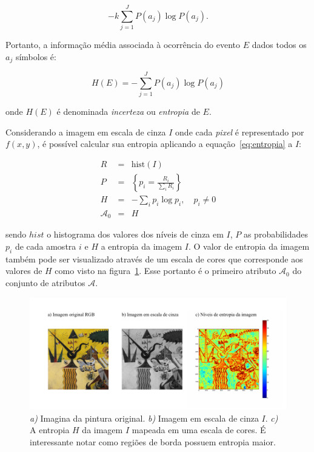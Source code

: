 \begin{equation}
  -k \sum_{j=1}^J P(a_j) \log P(a_j).
\end{equation}

Portanto, a informação média associada à ocorrência do evento $E$
dados todos os $a_j$ símbolos é:

\begin{equation}
  H(E) =  -\sum_{j=1}^J P(a_j) \log P(a_j)
  \label{eq:entropia}
\end{equation} 

\noindent onde $H(E)$ é denominada \emph{incerteza} ou \emph{entropia} de $E$.

Considerando a imagem em escala de cinza $I$ onde cada \textit{pixel} é
representado por $f(x,y)$, é possível calcular sua entropia aplicando
a equação~\ref{eq:entropia} a $I$:

\begin{eqnarray}
  R & = & \text{hist}(I) \\
  P & = & \left\{ p_i = \frac{R_i}{\sum_{i} R_i} \right\}\\
  H & = & -\sum_i p_i \log p_i, \,\,\,\,\,\, p_i \neq 0 \\
  \mathcal{A}_0 & = & H
\end{eqnarray}

\noindent sendo $hist$ o histograma dos valores dos níveis de cinza em
$I$, $P$ as probabilidades $p_i$ de cada amostra $i$ e $H$ a entropia
da imagem $I$. O valor de entropia da imagem também pode ser
visualizado através de um escala de cores que corresponde aos valores
de $H$ como visto na figura~\ref{fig:entrop}. Esse portanto é o
primeiro atributo $\mathcal{A}_0$ do conjunto de atributos
$\mathcal{A}$.

\begin{figure}[h!]
\begin{center}
      \caption{\textit{a)} Imagina da pintura original. \textit{b)}
        Imagem em escala de cinza $I$. \textit{c)} A entropia $H$ da
        imagem $I$ mapeada em uma escala de cores. É interessante
        notar como regiões de borda possuem entropia maior.}
        \label{fig:entrop}
        \includegraphics[scale=1]{figs/entrop}
        \fonteminha
\end{center}
\end{figure}

